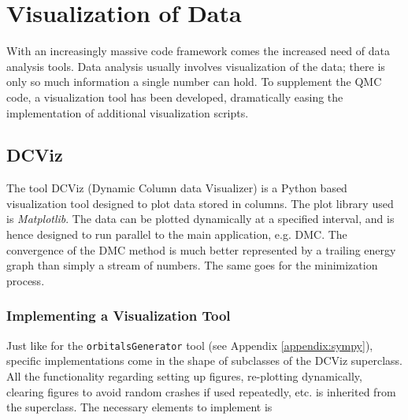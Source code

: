 \chapter{Visualization of Data}

With an increasingly massive code framework comes the increased need of data analysis tools. Data analysis usually involves visualization of the data; there is only so much information a single number can hold. To supplement the QMC code, a visualization tool has been developed, dramatically easing the implementation of additional visualization scripts.

\section{DCViz}

The tool DCViz (Dynamic Column data Visualizer) is a Python based visualization tool designed to plot data stored in columns. The plot library used is \textit{Matplotlib}. The data can be plotted dynamically at a specified interval, and is hence designed to run parallel to the main application, e.g. DMC. The convergence of the DMC method is much better represented by a trailing energy graph than simply a stream of numbers. The same goes for the minimization process.

\subsection{Implementing a Visualization Tool}

Just like for the \verb+orbitalsGenerator+ tool (see Appendix \ref{appendix:sympy}), specific implementations come in the shape of subclasses of the DCViz superclass. All the functionality regarding setting up figures, re-plotting dynamically, clearing figures to avoid random crashes if used repeatedly, etc. is inherited from the superclass. The necessary elements to implement is

